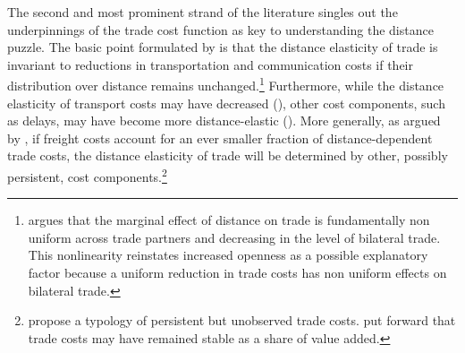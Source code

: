 \documentclass[12pt,twoside,a4paper,notitlepage]{article}
\begin{document}
%

The second and most prominent strand of the literature singles out the underpinnings of the trade cost function as key to understanding the distance puzzle.
The basic point formulated by \cite{Buch2004} is that the distance elasticity of trade is invariant to reductions in transportation and communication costs if their distribution over distance remains unchanged.\footnote{\cite{Egger2008} argues that the marginal effect of distance on trade is fundamentally non uniform across trade partners and decreasing in the level of bilateral trade.
This nonlinearity reinstates increased openness as a possible explanatory factor because a uniform reduction in trade costs has non uniform effects on bilateral trade.}
Furthermore, while the distance elasticity of transport costs may have decreased (\cite{Hummels2007}), other cost components, such as delays, may have become more distance-elastic (\cite{Hummels2013}).
More generally, as argued by \cite{Head2013}, if freight costs account for an ever smaller fraction of distance-dependent trade costs, the distance elasticity of trade will be determined by other, possibly persistent, cost components.\footnote{\cite{Head2013} propose a typology of persistent but unobserved trade costs.
\cite{Daudin2003, Daudin2005} put forward that trade costs may have remained stable as a share of value added.}
%
\end{document}
